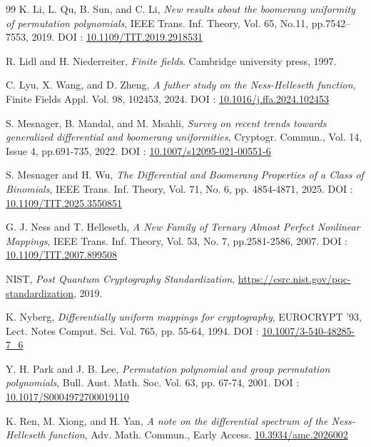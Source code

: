 \documentclass[11pt]{article}
\numberwithin{theorem}{section}
\begin{document}
\begin{thebibliography}{99}
 K. Li, L. Qu, B. Sun, and C. Li, \emph{New results about the boomerang uniformity of permutation polynomials}, IEEE Trans. Inf. Theory, Vol. 65, No.11, pp.7542–7553, 2019.  DOI : \href{https://doi.org/10.1109/TIT.2019.2918531}{10.1109/TIT.2019.2918531}


 R. Lidl and H. Niederreiter, \emph{Finite fields}. Cambridge university press, 1997.

 C. Lyu, X. Wang, and D. Zheng, \emph{A futher study on the Ness-Helleseth function}, Finite Fields Appl. Vol. 98, 102453, 2024.
DOI : \href{https://doi.org/10.1016/j.ffa.2024.102453}{10.1016/j.ffa.2024.102453}


 S. Mesnager, B. Mandal, and M. Msahli, \emph{Survey on recent trends towards generalized differential and boomerang uniformities}, Cryptogr. Commun., Vol. 14, Issue 4, pp.691-735, 2022.
DOI : \href{https://doi.org/10.1007/s12095-021-00551-6} {10.1007/s12095-021-00551-6}

 S. Mesnager and H. Wu, \emph{The Differential and Boomerang Properties of a Class of Binomials}, IEEE Trans. Inf. Theory, Vol. 71, No. 6, pp. 4854-4871, 2025.
DOI : \href{https://doi.org/10.1109/TIT.2025.3550851}{10.1109/TIT.2025.3550851}

 G. J. Ness and T. Helleseth, \emph{A New Family of Ternary Almost Perfect Nonlinear Mappings}, IEEE Trans. Inf. Theory, Vol. 53, No. 7, pp.2581-2586, 2007.
DOI : \href{https://doi.org/10.1109/TIT.2007.899508}{10.1109/TIT.2007.899508}

 NIST, \emph{Post Quantum Cryptography Standardization}, \href{https://csrc.nist.gov/pqc-standardization}{https://csrc.nist.gov/pqc-standardization}, 2019. 

 K. Nyberg, \emph{Differentially uniform mappings for cryptography}, EUROCRYPT '93, Lect. Notes Comput. Sci. Vol. 765, pp. 55-64, 1994.
DOI : \href{https://doi.org/10.1007/3-540-48285-7_6}{10.1007/3-540-48285-7\_6}

 Y. H. Park and J. B. Lee, \emph{Permutation polynomial and group permutation polynomials}, Bull. Aust. Math. Soc. Vol. 63, pp. 67-74, 2001.
DOI : \href{https://doi.org/10.1017/S0004972700019110}{10.1017/S0004972700019110}

 K. Ren, M. Xiong, and H. Yan, \emph{A note on the differential spectrum of the Ness-Helleseth function}, Adv. Math. Commun., Early Access. \href{https://doi.org/10.3934/amc.2026002} {10.3934/amc.2026002}


\end{thebibliography}
\end{document}

